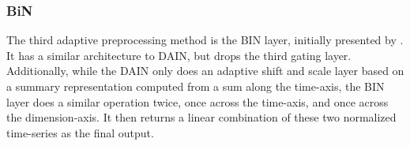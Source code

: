 \documentclass{statsmsc}
\begin{document}
{%



\subsubsection{BiN}%
\label{ssub:BiN}



The third adaptive preprocessing method is the \acf{BIN} layer, initially
presented by \cite{bin}. It has a similar architecture to \ac{DAIN}, but drops the
third gating layer. Additionally, while the \ac{DAIN} only does an adaptive shift and scale layer
based on a summary representation computed from a sum along the time-axis, the \ac{BIN} layer
does a similar operation twice, once across the time-axis, and once across the dimension-axis.
It then returns a linear combination of these two normalized time-series as the
final output.

}
\end{document}
